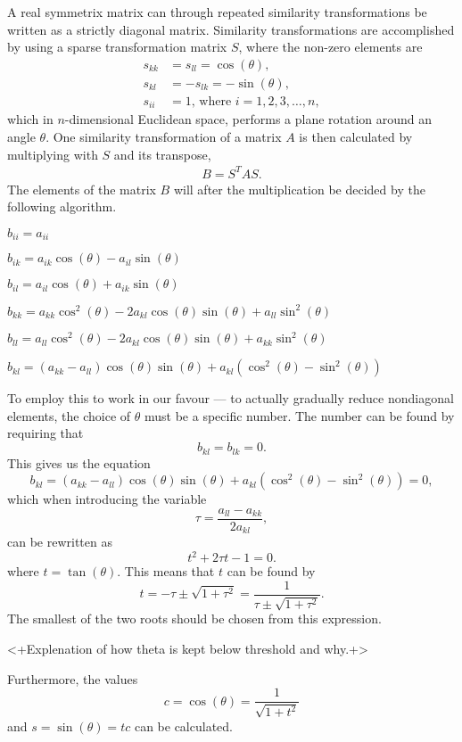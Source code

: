 A real symmetrix matrix can through repeated similarity
transformations be written as a strictly diagonal matrix.
Similarity transformations are accomplished by using a sparse
transformation matrix $S$, where the non-zero elements are
\begin{align*}
    s_{kk} &= s_{ll} = \cos{(\theta)}, \\
    s_{kl} &= -s_{lk} = -\sin{(\theta)}, \\
    s_{ii} &= 1 \text{, where } i = 1,2,3,\dots,n,
\end{align*}
which in $n$-dimensional Euclidean space, performs a plane rotation
around an angle $\theta$. One similarity transformation of a matrix
$A$ is then calculated by multiplying with $S$ and its transpose,
\begin{align*}
    B = S^T A S.
\end{align*}
The elements of the matrix $B$ will after the multiplication be
decided by the following algorithm.
\begin{algorithmic}
        \State$b_{ii} = a_{ii}$

        \State $b_{ik} = a_{ik}\cos{(\theta)} - a_{il}\sin{(\theta)}$

        \State $b_{il} = a_{il}\cos{(\theta)} + a_{ik}\sin{(\theta)}$

        \State $b_{kk} = a_{kk}\cos^2{(\theta)} -
        2a_{kl}\cos{(\theta)}\sin{(\theta)} +
        a_{ll}\sin^2{(\theta)}$

        \State $b_{ll} = a_{ll}\cos^2{(\theta)} -
        2a_{kl}\cos{(\theta)}\sin{(\theta)} +
        a_{kk}\sin^2{(\theta)}$
        
        \State $b_{kl} =
        (a_{kk}-a_{ll})\cos{(\theta)}\sin{(\theta)} +
        a_{kl}(\cos^2{(\theta)} - \sin^2{(\theta)})$
    \EndFor
\end{algorithmic}
To employ this to work in our favour --- to actually gradually
reduce nondiagonal elements, the choice of $\theta$ must be a
specific number. The number can be found by requiring that \[b_{kl}
= b_{lk} = 0.\] This gives us the equation \[b_{kl} = (a_{kk} -
a_{ll})\cos{(\theta)}\sin{(\theta)} + a_{kl}(\cos^2{(\theta)} -
\sin^2{(\theta)}) = 0,\] which when introducing the variable \[\tau
= \frac{a_{ll}-a_{kk}}{2a_{kl}},\] can be rewritten as \[t^2 +
2\tau t - 1 = 0.\] where $t = \tan{(\theta)}$. This means that
$t$ can be found by \[t = -\tau \pm \sqrt{1 + \tau^2} =
\frac{1}{\tau \pm \sqrt{1 + \tau^2}}.\] The smallest of the two
roots should be chosen from this expression.

<+Explenation of how theta is kept below threshold and why.+>

Furthermore, the values \[c = \cos{(\theta)} = \frac{1}{\sqrt{1 +
t^2}}\] and $s = \sin{(\theta)} = tc$ can be calculated.
